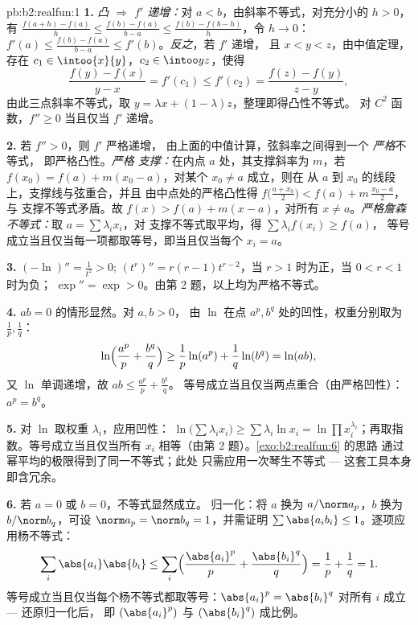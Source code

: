 \begin{solution}{pb:b2:realfun:1}
\textbf{1.} \emph{凸 $\Rightarrow$ $f'$ 递增：}对 $a <
b$，由斜率不等式，对充分小的 $h > 0$，有 $\frac{f(a+h)
- f(a)}h \leq \frac{f(b) - f(a)}{b-a} \leq \frac{f(b) -
f(b-h)}{h}$，令 $h \to 0$：$f'(a) \leq \frac{f(b) -
f(a)}{b - a} \leq f'(b)$。\emph{反之}，若 $f'$ 递增，
且 $x < y < z$，由中值定理，存在 $c_1 \in
\intoo{x}{y}$，$c_2 \in \intoo yz$，使得
\[
\frac{f(y) - f(x)}{y - x} = f'(c_1) \leq f'(c_2)
= \frac{f(z) - f(y)}{z - y},
\]
由此三点斜率不等式，取 $y = \lambda
x + (1 - \lambda)z$，整理即得凸性不等式。
对 $C^2$ 函数，$f'' \geq 0$ 当且仅当 $f'$ 递增。

\textbf{2.} 若 $f'' > 0$，则 $f'$ 严格递增，
由上面的中值计算，弦斜率之间得到一个 \emph{严格}不等式，
即严格凸性。\emph{严格
支撑：}在内点 $a$ 处，其支撑斜率为 $m$，若 $f(x_0) =
f(a) + m(x_0 - a)$，对某个 $x_0 \neq a$ 成立，则在
从 $a$ 到 $x_0$ 的线段上，支撑线与弦重合，并且
由中点处的严格凸性得 $f\bigl(\frac{a +
x_0}2\bigr) < f(a) + m\,\frac{x_0 - a}2$，与
支撑不等式矛盾。故 $f(x) > f(a) + m(x - a)$，对所有 $x \neq
a$。\emph{严格詹森不等式：}取 $a = \sum\lambda_ix_i$，对
支撑不等式取平均，得 $\sum\lambda_if(x_i) \geq f(a)$，
等号成立当且仅当每一项都取等号，即当且仅当每个 $x_i
= a$。

\textbf{3.} $(-\ln)'' = \frac1{t^2} > 0$; $(t^r)'' = r(r -
1)t^{r-2}$，当 $r > 1$ 时为正，当 $0 < r < 1$ 时为负；
$\exp'' = \exp > 0$。由第 2 题，以上均为严格不等式。

\textbf{4.} $ab = 0$ 的情形显然。对 $a, b > 0$，
由 $\ln$ 在点 $a^p, b^q$ 处的凹性，权重分别取为
$\frac1p, \frac1q$：
\[
\ln\Bigl(\frac{a^p}p + \frac{b^q}q\Bigr) \geq
\frac1p\ln(a^p) + \frac1q\ln(b^q) = \ln(ab),
\]
又 $\ln$ 单调递增，故 $ab \leq \frac{a^p}p + \frac{b^q}q$。
等号成立当且仅当两点重合（由严格凹性）：$a^p =
b^q$。

\textbf{5.} 对 $\ln$ 取权重 $\lambda_i$，应用凹性：
$\ln\bigl(\sum\lambda_ix_i\bigr) \geq \sum\lambda_i\ln x_i =
\ln\prod x_i^{\lambda_i}$；再取指数。等号成立当且仅当所有 $x_i$ 
相等（由第 2 题）。\cref{exo:b2:realfun:6} 的思路
通过幂平均的极限得到了同一不等式；此处
只需应用一次琴生不等式 ---
这套工具本身即含冗余。

\textbf{6.} 若 $a = 0$ 或 $b = 0$，不等式显然成立。
归一化：将 $a$ 换为 $a/\norm a_p$，$b$ 换为 $b/\norm
b_q$，可设 $\norm a_p = \norm b_q = 1$，并需证明
$\sum\abs{a_ib_i} \leq 1$。逐项应用杨不等式：
\[
\sum_i\abs{a_i}\abs{b_i} \leq
\sum_i\Bigl(\frac{\abs{a_i}^p}{p} +
\frac{\abs{b_i}^q}{q}\Bigr) = \frac1p + \frac1q = 1 .
\]
等号成立当且仅当每个杨不等式都取等号：$\abs{a_i}^p =
\abs{b_i}^q$ 对所有 $i$ 成立 --- 还原归一化后，
即 $(\abs{a_i}^p)$ 与 $(\abs{b_i}^q)$ 成比例。


\end{solution}
